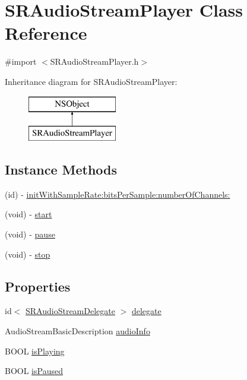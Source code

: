 \hypertarget{interface_s_r_audio_stream_player}{\section{S\-R\-Audio\-Stream\-Player Class Reference}
\label{interface_s_r_audio_stream_player}
}


{\ttfamily \#import $<$S\-R\-Audio\-Stream\-Player.\-h$>$}

Inheritance diagram for S\-R\-Audio\-Stream\-Player\-:\begin{figure}[H]
\begin{center}
\leavevmode
\includegraphics[height=2.000000cm]{interface_s_r_audio_stream_player}
\end{center}
\end{figure}
\subsection*{Instance Methods}
\begin{DoxyCompactItemize}
\item 
(id) -\/ \hyperlink{interface_s_r_audio_stream_player_a13160af103f692d51c283247abc9f84f}{init\-With\-Sample\-Rate\-:bits\-Per\-Sample\-:number\-Of\-Channels\-:}
\item 
(void) -\/ \hyperlink{interface_s_r_audio_stream_player_a6fc8fe16e2d71a4559ac02eb53ddecc5}{start}
\item 
(void) -\/ \hyperlink{interface_s_r_audio_stream_player_ae6d7fd93b4463b5658aec4edc8ed5e33}{pause}
\item 
(void) -\/ \hyperlink{interface_s_r_audio_stream_player_a9b149842ec383b2bdb969195f89b83bb}{stop}
\end{DoxyCompactItemize}
\subsection*{Properties}
\begin{DoxyCompactItemize}
\item 
id$<$ \hyperlink{protocol_s_r_audio_stream_delegate-p}{S\-R\-Audio\-Stream\-Delegate} $>$ \hyperlink{interface_s_r_audio_stream_player_a06224cd3120d632945796977400d5787}{delegate}
\item 
Audio\-Stream\-Basic\-Description \hyperlink{interface_s_r_audio_stream_player_aa12f4760470e2c9787c5e5fd61a624a5}{audio\-Info}
\item 
B\-O\-O\-L \hyperlink{interface_s_r_audio_stream_player_a870fcee585d9870bcdc03b829cfd16f0}{is\-Playing}
\item 
B\-O\-O\-L \hyperlink{interface_s_r_audio_stream_player_a73f1ac3f6b841e31163cdc82d9b6121f}{is\-Paused}
\end{DoxyCompactItemize}


